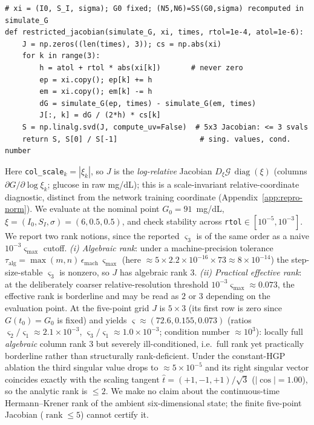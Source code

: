 \begin{verbatim}
# xi = (I0, S_I, sigma); G0 fixed; (N5,N6)=SS(G0,sigma) recomputed in simulate_G
def restricted_jacobian(simulate_G, xi, times, rtol=1e-4, atol=1e-6):
    J = np.zeros((len(times), 3)); cs = np.abs(xi)
    for k in range(3):
        h = atol + rtol * abs(xi[k])       # never zero
        ep = xi.copy(); ep[k] += h
        em = xi.copy(); em[k] -= h
        dG = simulate_G(ep, times) - simulate_G(em, times)
        J[:, k] = dG / (2*h) * cs[k]
    S = np.linalg.svd(J, compute_uv=False)  # 5x3 Jacobian: <= 3 svals
    return S, S[0] / S[-1]                   # sing. values, cond. number
\end{verbatim}

Here \texttt{col\_scale}$_k=|\xi_k|$, so $J$ is the \emph{log-relative} Jacobian $D_\xi\mathcal{G}\,\operatorname{diag}(\xi)$
(columns $\partial G/\partial\log\xi_k$; glucose in raw mg/dL); this is a scale-invariant relative-coordinate
diagnostic, distinct from the network training coordinate (Appendix~\ref{app:repro-norm}). We evaluate at the
nominal point $G_0=91$~mg/dL, $\xi=(I_0,S_I,\sigma)=(6,0.5,0.5)$, and check stability across
\texttt{rtol}$\in[10^{-5},10^{-3}]$. We report two rank notions, since the reported $\varsigma_3$ is of the
same order as a naive $10^{-3}\varsigma_{\max}$ cutoff. \emph{(i) Algebraic rank}: under a machine-precision
tolerance $\tau_{\mathrm{alg}}=\max(m,n)\,\epsilon_{\mathrm{mach}}\,\varsigma_{\max}$ (here
$\approx5\times2.2\times10^{-16}\times73\approx8\times10^{-14}$) the step-size-stable $\varsigma_3$ is nonzero,
so $J$ has algebraic rank $3$. \emph{(ii) Practical effective rank}: at the deliberately coarser
relative-resolution threshold $10^{-3}\varsigma_{\max}\approx0.073$, the effective rank is borderline and may be
read as $2$ or $3$ depending on the evaluation point. At the five-point grid $J$ is $5\times3$ (its first row is
zero since $G(t_0)=G_0$ is fixed) and yields $\varsigma\approx(72.6,0.155,0.073)$ (ratios
$\varsigma_2/\varsigma_1\approx2.1\times10^{-3}$, $\varsigma_3/\varsigma_1\approx1.0\times10^{-3}$; condition
number $\approx10^3$): locally full \emph{algebraic} column rank $3$ but severely ill-conditioned, i.e.\ full
rank yet practically borderline rather than structurally rank-deficient. Under the constant-HGP ablation the third singular value drops to $\approx5\times10^{-5}$ and
its right singular vector coincides exactly with the scaling tangent $\hat t=(+1,-1,+1)/\sqrt3$ ($|\cos|=1.00$),
so the analytic rank is $\le2$. We make no claim about the continuous-time Hermann--Krener rank of the ambient
six-dimensional state; the finite five-point Jacobian ($\operatorname{rank}\le5$) cannot certify it.

